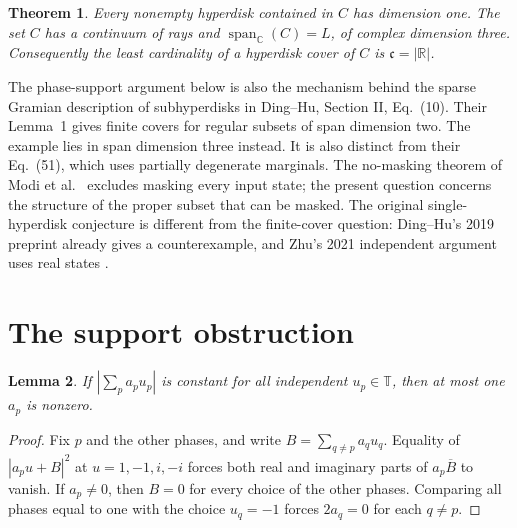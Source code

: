 \documentclass[11pt]{article}
\newtheorem{theorem}{Theorem}
\newtheorem{lemma}[theorem]{Lemma}
\newcommand{\C}{\mathbb C}
\newcommand{\T}{\mathbb T}
\newcommand{\Span}{\operatorname{span}_{\C}}
\begin{document}
\begin{theorem}\label{thm:main}
Every nonempty hyperdisk contained in $C$ has dimension one. The set $C$
has a continuum of rays and $\Span(C)=L$, of complex dimension three.
Consequently the least cardinality of a hyperdisk cover of $C$ is
$\mathfrak c=|\mathbb R|$.
\end{theorem}

The phase-support argument below is also the mechanism behind the sparse
Gramian description of subhyperdisks in Ding--Hu, Section II, Eq.~(10).
Their Lemma~1 gives finite covers for regular subsets of span dimension
two. The example lies in span dimension three instead. It is also distinct
from their Eq.~(51), which uses partially degenerate marginals. The
no-masking theorem of Modi et al.~\cite{modi} excludes masking every
input state; the present question concerns the structure of the proper
subset that can be masked. The original single-hyperdisk conjecture is
different from the finite-cover question: Ding--Hu's 2019 preprint already
gives a counterexample, and Zhu's 2021 independent argument uses real
states \cite[Section VII, Proposition 4]{zhu}.

\section{The support obstruction}
\begin{lemma}\label{lem:modulus}
If $|\sum_pa_pu_p|$ is constant for all independent $u_p\in\T$, then
at most one $a_p$ is nonzero.
\end{lemma}
\begin{proof}
Fix $p$ and the other phases, and write $B=\sum_{q\ne p}a_qu_q$.
Equality of $|a_pu+B|^2$ at $u=1,-1,i,-i$ forces both real and
imaginary parts of $a_p\overline B$ to vanish. If $a_p\ne0$, then $B=0$
for every choice of the other phases. Comparing all phases equal to one
with the choice $u_q=-1$ forces $2a_q=0$ for each $q\ne p$.
\end{proof}
\end{document}
